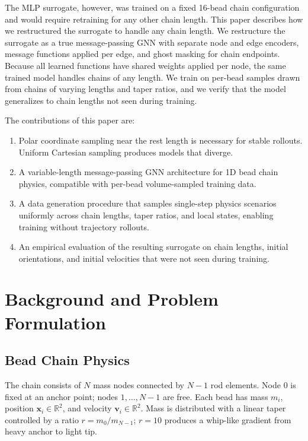 \documentclass[conference]{IEEEtran}
\begin{document}
The MLP surrogate, however, was trained on a fixed 16-bead chain configuration and would require retraining for any other chain length. This paper describes how we restructured the surrogate to handle any chain length. We restructure the surrogate as a true message-passing GNN with separate node and edge encoders, message functions applied per edge, and ghost masking for chain endpoints. Because all learned functions have shared weights applied per node, the same trained model handles chains of any length. We train on per-bead samples drawn from chains of varying lengths and taper ratios, and we verify that the model generalizes to chain lengths not seen during training.

The contributions of this paper are:
\begin{enumerate}
    \item Polar coordinate sampling near the rest length is necessary for stable rollouts. Uniform Cartesian sampling produces models that diverge.
    \item A variable-length message-passing GNN architecture for 1D bead chain physics, compatible with per-bead volume-sampled training data.
    \item A data generation procedure that samples single-step physics scenarios uniformly across chain lengths, taper ratios, and local states, enabling training without trajectory rollouts.
    \item An empirical evaluation of the resulting surrogate on chain lengths, initial orientations, and initial velocities that were not seen during training.
\end{enumerate}

\section{Background and Problem Formulation}

\subsection{Bead Chain Physics}

The chain consists of $N$ mass nodes connected by $N-1$ rod elements. Node 0 is fixed at an anchor point; nodes $1, \ldots, N-1$ are free. Each bead has mass $m_i$, position $\mathbf{x}_i \in \mathbb{R}^2$, and velocity $\mathbf{v}_i \in \mathbb{R}^2$. Mass is distributed with a linear taper controlled by a ratio $r = m_0 / m_{N-1}$; $r = 10$ produces a whip-like gradient from heavy anchor to light tip.
\end{document}
